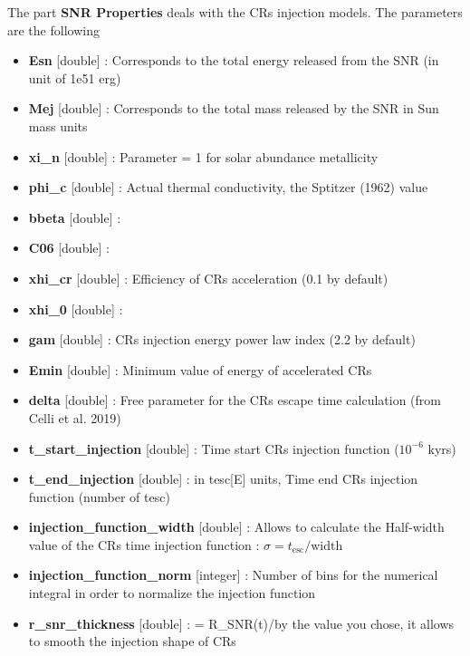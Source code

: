         \noi The part {\bf{SNR Properties}} deals with the CRs injection models. The parameters are the following 

        \begin{itemize}
            \item {\bf{Esn}} [double] : Corresponds to the total energy released from the SNR (in unit of 1e51 erg)
            \item {\bf{Mej}} [double] : Corresponds to the total mass released by the SNR in Sun mass units 
            \item {\bf{xi\_n}} [double] : Parameter = 1 for solar abundance metallicity 
            \item {\bf{phi\_c}} [double] : Actual thermal conductivity, the Sptitzer (1962) value 
            \item {\bf{bbeta}} [double] : 
            \item {\bf{C06}} [double] : 
            \item {\bf{xhi\_cr}} [double] : Efficiency of CRs acceleration (0.1 by default)
            \item {\bf{xhi\_0}} [double] : 
            \item {\bf{gam}} [double] : CRs injection energy power law index (2.2 by default)
            \item {\bf{Emin}} [double] : Minimum value of energy of accelerated CRs 
            \item {\bf{delta}} [double] : Free parameter for the CRs escape time calculation (from Celli et al. 2019)
            \item {\bf{t\_start\_injection}} [double] : Time start CRs injection function ($10^{-6}$ kyrs)
            \item {\bf{t\_end\_injection}} [double] : in tesc[E] units, Time end CRs injection function (number of tesc)
            \item {\bf{injection\_function\_width}} [double] : Allows to calculate the Half-width value of the CRs time injection function : $\sigma = t_\mathrm{esc}/\mathrm{width}$ 
            \item {\bf{injection\_function\_norm}} [integer] : Number of bins for the numerical integral in order to normalize the injection function
            \item {\bf{r\_snr\_thickness}} [double] : = R\_SNR(t)/by the value you chose, it allows to smooth the injection shape of CRs  
        \end{itemize}



